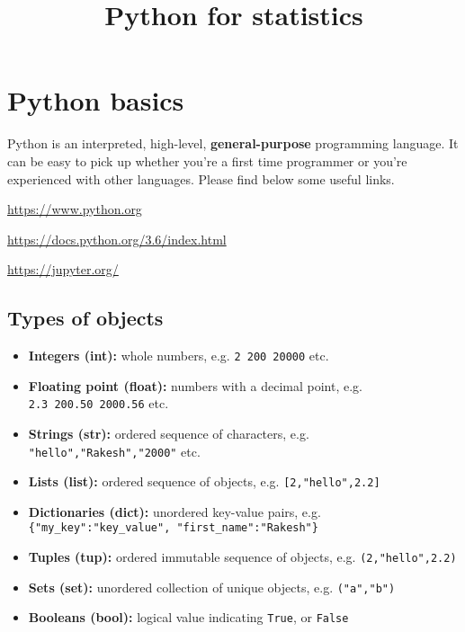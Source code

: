 \documentclass[11pt]{article}
\title{Python for statistics}
\providecommand{\tightlist}{%
      \setlength{\itemsep}{0pt}\setlength{\parskip}{0pt}}
\begin{document}
    
    
    \maketitle
    
    

    
    \section{Python basics}\label{python-basics}

Python is an interpreted, high-level, \textbf{general-purpose}
programming language. It can be easy to pick up whether you're a first
time programmer or you're experienced with other languages. Please find
below some useful links.

\url{https://www.python.org}

\url{https://docs.python.org/3.6/index.html}

\url{https://jupyter.org/}

    \subsection{Types of objects}\label{types-of-objects}

\begin{itemize}
\tightlist
\item
  \textbf{Integers (int):} whole numbers, e.g. \texttt{2\ 200\ 20000}
  etc.
\item
  \textbf{Floating point (float):} numbers with a decimal point, e.g.
  \texttt{2.3\ 200.50\ 2000.56} etc.
\item
  \textbf{Strings (str):} ordered sequence of characters, e.g.
  \texttt{"hello","Rakesh","2000"} etc.
\item
  \textbf{Lists (list):} ordered sequence of objects, e.g.
  \texttt{{[}2,"hello",2.2{]}}
\item
  \textbf{Dictionaries (dict):} unordered key-value pairs, e.g.
  \texttt{\{"my\_key":"key\_value",\ "first\_name":"Rakesh"\}}
\item
  \textbf{Tuples (tup):} ordered immutable sequence of objects, e.g.
  \texttt{(2,"hello",2.2)}
\item
  \textbf{Sets (set):} unordered collection of unique objects, e.g.
  \texttt{("a","b")}\\
\item
  \textbf{Booleans (bool):} logical value indicating \texttt{True}, or
  \texttt{False}
\end{itemize}
\end{document}
